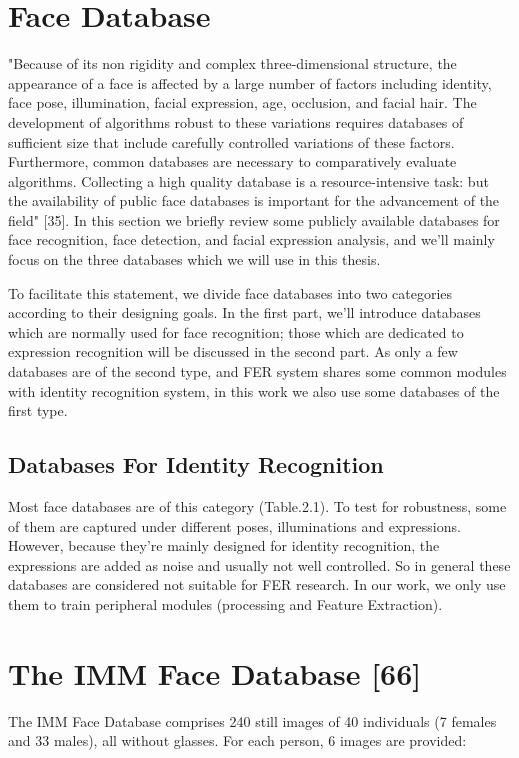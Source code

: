 \documentclass[12pt, twoside]{report}
\begin{document}
	\newpage
	\section{Face Database}
	"Because of its non rigidity and complex three-dimensional structure, the appearance of a face is affected by a large number of factors including identity, face pose, illumination, facial expression, age, occlusion, and facial hair. The development of algorithms robust to these variations requires databases of sufficient size that include carefully controlled variations of these factors. Furthermore, common databases are necessary to comparatively evaluate algorithms. Collecting a high quality database is a resource-intensive task: but the availability of public face databases is important for the advancement of the field" [35]. In this section we briefly review some publicly available databases for face recognition, face detection, and facial expression analysis, and we'll mainly focus on the three databases which we will use in this thesis. 
	\par
	To facilitate this statement, we divide face databases into two categories according to their designing goals. In the first part, we'll introduce databases which are normally used for face recognition; those which are dedicated to expression recognition will be discussed in the second part. As only a few databases are of the second type, and FER system shares some common modules with identity recognition system, in this work we also use some databases of the first type.

	\subsection{Databases For Identity Recognition}
	Most face databases are of this category (Table.2.1). To test for robustness, some of them are captured under different poses, illuminations and expressions. However, because they're mainly designed for identity recognition, the expressions are added as noise and usually not well controlled. So in general these databases are considered not suitable for FER research. In our work, we only use them to train peripheral modules (processing and Feature Extraction).

	\section*{The IMM Face Database [66]}
	The IMM Face Database comprises 240 still images of 40 individuals (7 females and 33 males), all without glasses. For each person, 6 images are provided:
\end{document}

